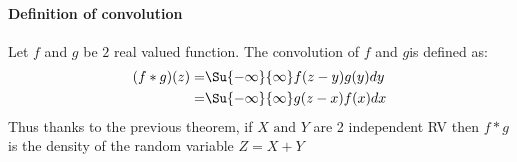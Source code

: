 \paragraph{Definition of convolution}
Let $f$ and $g$ be $2$ real valued function. The convolution of $f$ and $g$is defined as:
\begin{align*}
	(f*g)(z)=&\Su{ {-\infty}}{\infty}f(z-y)g(y)dy\\
	=& \Su{ {-\infty}}{\infty}g(z-x)f(x)dx
\end{align*}
Thus thanks to the previous theorem, if $X\text{ and }Y$ are 2 independent RV then $f*g$ is the density of the random variable $Z= X+Y$ 
